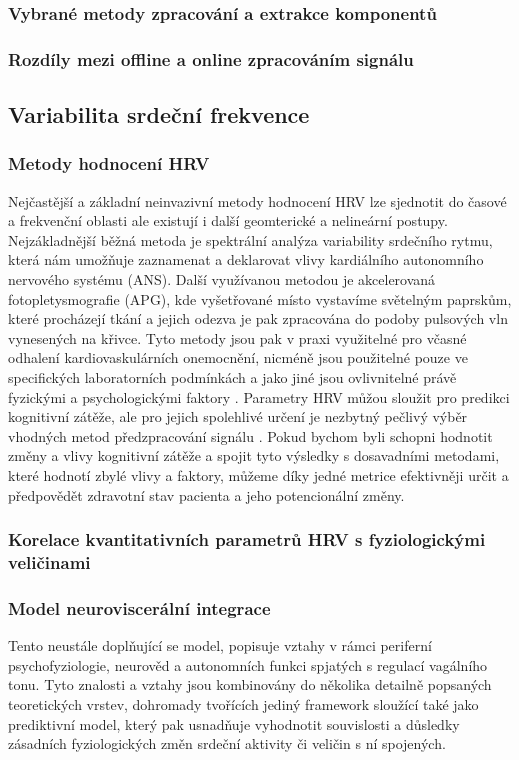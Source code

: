 \subsubsection{Vybrané metody zpracování a extrakce komponentů}
\subsubsection{Rozdíly mezi offline a online zpracováním signálu}

\subsection{Variabilita srdeční frekvence}
\label{section:hrv}

\subsubsection{Metody hodnocení HRV}
Nejčastější a základní neinvazivní metody hodnocení HRV lze sjednotit do časové
a frekvenční oblasti ale existují i další geomterické a nelineární postupy.
Nejzákladnější běžná metoda je spektrální analýza variability srdečního rytmu,
která nám umožňuje zaznamenat a deklarovat vlivy kardiálního autonomního
nervového systému (ANS). Další využívanou metodou je akcelerovaná
fotopletysmografie (APG), kde vyšetřované místo vystavíme světelným paprskům,
které procházejí tkání a jejich odezva je pak zpracována do podoby pulsových vln
vynesených na křivce. Tyto metody jsou pak v praxi využitelné pro včasné
odhalení kardiovaskulárních onemocnění, nicméně jsou použitelné pouze ve
specifických laboratorních podmínkách a jako jiné jsou ovlivnitelné právě
fyzickými a psychologickými faktory \cite{[2, 4, 5]}. Parametry HRV můžou
sloužit pro predikci kognitivní zátěže, ale pro jejich spolehlivé určení je
nezbytný pečlivý výběr vhodných metod předzpracování signálu \cite{[1, 3]}.
Pokud bychom byli schopni hodnotit změny a vlivy kognitivní zátěže a spojit tyto
výsledky s dosavadními metodami, které hodnotí zbylé vlivy a faktory, můžeme
díky jedné metrice efektivněji určit a předpovědět zdravotní stav pacienta a
jeho potencionální změny.

\subsubsection{Korelace kvantitativních parametrů HRV s fyziologickými veličinami}


\subsubsection{Model neuroviscerální integrace}
Tento neustále doplňující se model, popisuje vztahy v rámci periferní
psychofyziologie, neurověd a autonomních funkci spjatých s regulací vagálního
tonu. Tyto znalosti a vztahy jsou kombinovány do několika detailně popsaných
teoretických vrstev, dohromady tvořících jediný framework sloužící také jako
prediktivní model, který pak usnadňuje vyhodnotit souvislosti a důsledky
zásadních fyziologických změn srdeční aktivity či veličin s ní spojených.

